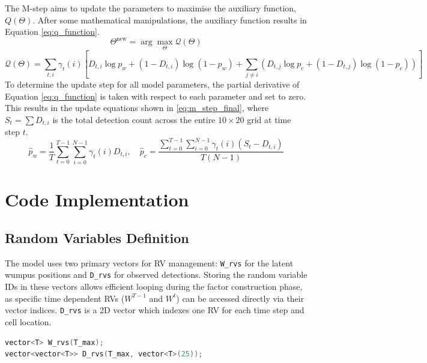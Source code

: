\documentclass[10pt]{article}
\begin{document}
The M-step aims to update the parameters to maximise the auxiliary function, $Q(\Theta)$. After some mathematical manipulations, the 
auxiliary function results in Equation \ref{eq:q_function}.
\begin{equation}
\Theta^{\text{new}} = \arg \max_{\Theta} \mathcal{Q}(\Theta)
\end{equation}
\begin{equation}
    \mathcal{Q}(\Theta) = \sum_{t,i} \gamma_t(i) \left[ D_{t,i} \log p_w + (1-D_{t,i}) \log(1-p_w) + \sum_{j \neq i} (D_{t,j} \log p_c + (1-D_{t,j}) \log(1-p_c)) \right]
    \label{eq:q_function}
\end{equation}
To determine the update step for all model parameters, the partial derivative of Equation \ref{eq:q_function} is taken with respect to each parameter and set to zero. 
This results in the update equations shown in \ref{eq:m_step_final}, where $S_t = \sum D_{t,i}$ is the total detection count across the entire $10 \times 20$ grid at time step $t$.
\begin{equation}
    \hat{p}_w = \frac{1}{T} \sum_{t=0}^{T-1} \sum_{i=0}^{N-1} \gamma_t(i) D_{t,i}, \quad \hat{p}_c = \frac{\sum_{t=0}^{T-1} \sum_{i=0}^{N-1} \gamma_t(i) (S_t - D_{t,i})}{T(N-1)}
    \label{eq:m_step_final}
\end{equation}

\section{Code Implementation}
\label{sec:implementation}
\subsection{Random Variables Definition}
The model uses two primary vectors for RV management: \texttt{W\_rvs} for the latent wumpus positions 
and \texttt{D\_rvs} for observed detections. Storing the random variable IDs in these vectors 
allows efficient looping during the factor construction phase, as specific time dependent RVs ($W^{T-1}$ and $W^t$) can be accessed 
directly via their vector indices. \texttt{D\_rvs} is a 2D vector which indexes one RV for each time step and cell location.

\begin{lstlisting}[language=C++, caption={Declaration of latent and observable random variable vectors.}, label={lst:rv_init}]
vector<T> W_rvs(T_max); 
vector<vector<T>> D_rvs(T_max, vector<T>(25));
\end{lstlisting}
\end{document}
